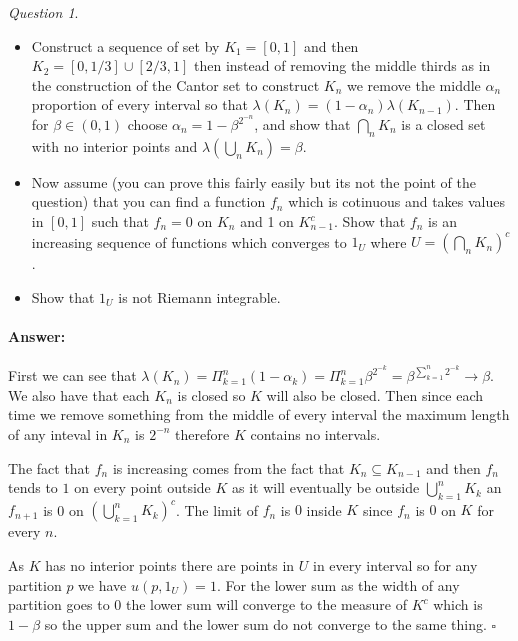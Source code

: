 \documentclass[11pt]{article}
\theoremstyle{definition}
\theoremstyle{remark}
\newtheorem{q}{Question}
\newenvironment{ans}{\paragraph{Answer:}}{\hfill$\square$\vspace{10pt}}
\begin{document}
\begin{q}
\begin{itemize}
\item Construct a sequence of set by $K_1 = [0,1]$ and then $K_2 = [0,1/3]\cup[2/3,1]$ then instead of removing the middle thirds as in the construction of the Cantor set to construct $K_n$ we remove the middle $\alpha_n$ proportion of every interval so that $\lambda(K_n) = (1-\alpha_n) \lambda(K_{n-1})$. Then for $\beta \in (0,1)$ choose $\alpha_n = 1- \beta^{2^{-n}}$, and show that $\bigcap_n K_n$ is a closed set with no interior points and $\lambda(\bigcup_n K_n) = \beta$.
\item Now assume (you can prove this fairly easily but its not the point of the question) that you can find a function $f_n$ which is cotinuous and takes values in $[0,1]$ such that $f_n =0$ on $K_n$ and 1 on $K_{n-1}^c$. Show that $f_n$ is an increasing sequence of functions which converges to $1_U$ where $U = (\bigcap_n K_n)^c$. 
\item Show that $1_U$ is not Riemann integrable.
\end{itemize}
\end{q}

\begin{ans}
First we can see that $\lambda(K_n) = \Pi_{k=1}^n (1-\alpha_k) = \Pi_{k=1}^n \beta^{2^{-k}} = \beta^{\sum_{k=1}^n 2^{-k}} \rightarrow \beta$. We also have that each $K_n$ is closed so $K$ will also be closed. Then since each time we remove something from the middle of every interval the maximum length of any inteval in $K_n$ is $2^{-n}$ therefore $K$ contains no intervals.

The fact that $f_n$ is increasing comes from the fact that $K_n \subseteq K_{n-1}$ and then $f_n$ tends to $1$ on every point outside $K$ as it will eventually be outside $\bigcup_{k=1}^n K_k$ an $f_{n+1}$ is 0 on $\left( \bigcup_{k=1}^n K_k\right)^c$. The limit of $f_n$ is $0$ inside $K$ since $f_n$ is $0$ on $K$ for every $n$.

As $K$ has no interior points there are points in $U$ in every interval so for any partition $p$ we have $u(p, 1_U) =1$. For the lower sum as the width of any partition goes to $0$ the lower sum will converge to the measure of $K^c$ which is $1-\beta$ so the upper sum and the lower sum do not converge to the same thing.
\end{ans}
\end{document}
